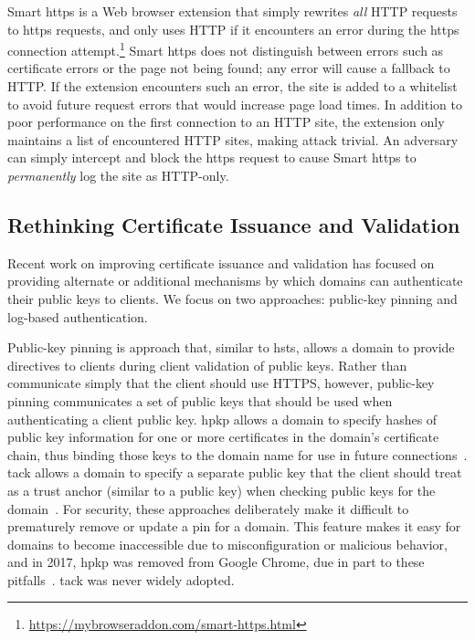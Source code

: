 Smart \ac{https} is a Web browser extension that simply rewrites \emph{all} HTTP
requests to \ac{https} requests, and only uses HTTP if it encounters an error
during the \ac{https} connection
attempt.\footnote{\url{https://mybrowseraddon.com/smart-https.html}} Smart
\ac{https} does not distinguish between errors such as certificate errors or the
page not being found; any error will cause a fallback to HTTP. If the extension
encounters such an error, the site is added to a whitelist to avoid future
request errors that would increase page load times. In addition
to poor performance on the first connection to an HTTP site, the extension only
maintains a list of encountered HTTP sites, making  attack trivial. An
adversary can simply intercept and block the \ac{https} request to cause Smart
\ac{https} to \emph{permanently} log the site as HTTP-only.

\subsection{Rethinking Certificate Issuance and Validation}

Recent work on improving certificate issuance and validation has focused on
providing alternate or additional mechanisms by which domains can authenticate
their public keys to clients. We focus on two approaches: public-key pinning and
log-based authentication.

Public-key pinning is  approach that, similar to \ac{hsts}, allows a
domain to provide directives to clients during client validation of public keys.
Rather than communicate simply that the client should use HTTPS, however,
public-key pinning communicates a set of public keys that should be used when
authenticating a client public key. \ac{hpkp} allows a domain to specify hashes
of public key information for one or more certificates in the domain's
certificate chain, thus binding those keys to the domain name for use in future
connections~\cite{rfc7469}. \ac{tack} allows a domain to specify a separate
public key that the client should treat as a trust anchor (similar to a  public key) 
when checking public keys for the domain~\cite{marlinspike2013trust}. For security,
these approaches deliberately make it difficult to prematurely remove or update
a pin for a domain. This feature makes it easy for domains to become
inaccessible due to misconfiguration or malicious behavior, and in 2017,
\ac{hpkp} was removed from Google Chrome, due in part to these
pitfalls~\cite{palmer2017intent}. \ac{tack} was never widely adopted.

